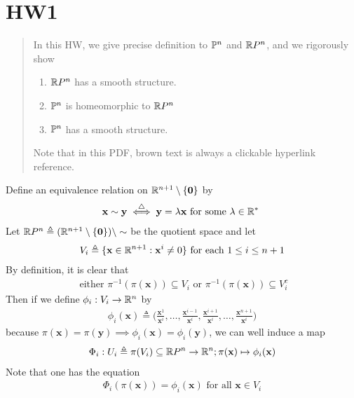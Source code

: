 \documentclass{report}
\begin{document}
\section{HW1} 
\begin{abstract}
In this HW, we give precise definition to $\P^n$  and $\RP^n$, and we rigorously show
\begin{enumerate}[label=(\alph*)]
  \item $\RP^n$  has a smooth structure. 
  \item $\P^n$ is homeomorphic to $\RP^n$ 
   \item $\P^n$ has a smooth structure.
\end{enumerate}
Note that in this PDF, brown text is always a clickable hyperlink reference. 
\end{abstract}
\begin{mdframed}
Define an equivalence relation on $\R^{n+1}\setminus \set{\textbf{0}}$ by 
\begin{align*}
\textbf{x}\sim \textbf{y}\overset{\triangle}{\iff }\textbf{y}=\ld \textbf{x}\text{ for some $\ld \inr^*$ } 
\end{align*}
Let $\RP ^n\triangleq (\R^{n+1}\setminus \set{\textbf{0}})\setminus \sim $ be the quotient space and let  
\begin{align*}
V_i\triangleq \set{\textbf{x}\inr^{n+1}:\textbf{x}^i \neq 0}\text{ for each }1\leq i\leq n+1
\end{align*}
By definition, it is clear that 
\begin{align*}
\text{ either }\pi^{-1}(\pi (\textbf{x}))\subseteq V_i\text{ or }\pi^{-1}(\pi (\textbf{x}))\subseteq V_i^c
\end{align*}
Then if we define $\phi_i:V_i\rightarrow \R^n$ by
\begin{align*}
\phi_i(\textbf{x})\triangleq \Big(\frac{\textbf{x}^1}{\textbf{x}^i},\dots ,\frac{\textbf{x}^{i-1}}{\textbf{x}^i},\frac{\textbf{x}^{i+1}}{\textbf{x}^i},\dots,\frac{\textbf{x}^{n+1}}{\textbf{x}^i} \Big)
\end{align*}
because $\pi (\textbf{x})=\pi(\textbf{y})\implies \phi_i(\textbf{x})=\phi_i(\textbf{y})$, we can well induce a map 
\begin{align*}
\Phi_i:U_i\triangleq \pi (V_i)\subseteq \R P^n\rightarrow \R^n; \pi (\textbf{x})\mapsto \phi_i(\textbf{x})
\end{align*}
Note that one has the equation 
\begin{align*}
\Phi_i(\pi (\textbf{x}))= \phi_i(\textbf{x})\text{ for all }\textbf{x}\in V_i
\end{align*}
\end{mdframed}
\end{document}
